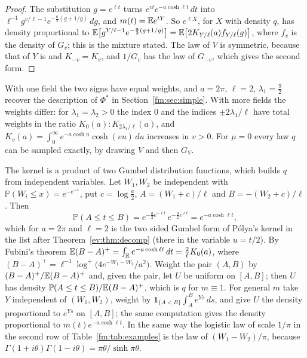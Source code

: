 \begin{proof}
The substitution $g=e^{\ell t}$ turns $e^{vt}e^{-a\cosh\ell t}\,dt$ into $\ell^{-1}g^{v/\ell-1}e^{-\frac a2(g+1/g)}\,dg$, and $m(t)=\mathbb{E} e^{tY}$. So $e^{\ell X}$, for $X$ with density $q$, has density proportional to $\mathbb{E}\big[g^{Y/\ell-1}e^{-\frac a2(g+1/g)}\big]=\mathbb{E}\big[2K_{Y/\ell}(a)f_{Y/\ell}(g)\big]$, where $f_v$ is the density of $G_v$; this is the mixture stated. The law of $V$ is symmetric, because that of $Y$ is and $K_{-v}=K_v$, and $1/G_v$ has the law of $G_{-v}$, which gives the second form.
\end{proof}

With one field the two signs have equal weights, and $a=2\pi$, $\ell=2$, $\lambda_1=\frac92$ recover the description of $\Phi^*$ in Section~\ref{fm:sec:simple}. With more fields the weights differ: for $\lambda_1=\lambda_2>0$ the index $0$ and the indices $\pm2\lambda_1/\ell$ have total weights in the ratio $K_0(a):K_{2\lambda_1/\ell}(a)$, and $K_v(a)=\int_0^\infty e^{-a\cosh u}\cosh(vu)\,du$ increases in $v>0$. For $\mu=0$ every law $q$ can be sampled exactly, by drawing $V$ and then $G_V$.

\begin{remark}\label{fm:rem:besselgumbel}
The kernel is a product of two Gumbel distribution functions, which builds $q$ from independent variables. Let $W_1,W_2$ be independent with $\mathbb P(W_i\le x)=e^{-e^{-x}}$, put $c=\log\frac a2$, $A=(W_1+c)/\ell$ and $B=-(W_2+c)/\ell$. Then
\[
\mathbb P(A\le t\le B)=e^{-\frac a2e^{-\ell t}}\,e^{-\frac a2e^{\ell t}}=e^{-a\cosh\ell t},
\]
which for $a=2\pi$ and $\ell=2$ is the two sided Gumbel form of P\'olya's kernel in the list after Theorem~\ref{ev:thm:decomp} (there in the variable $u=t/2$). By Fubini's theorem $\mathbb{E}(B-A)^+=\int_{\mathbb{R}}e^{-a\cosh\ell t}\,dt=\frac2\ell K_0(a)$, where $(B-A)^+=\ell^{-1}\log^+\big(4e^{-W_1-W_2}/a^2\big)$. Weight the pair $(A,B)$ by $(B-A)^+/\mathbb{E}(B-A)^+$ and, given the pair, let $U$ be uniform on $[A,B]$; then $U$ has density $\mathbb P(A\le t\le B)/\mathbb{E}(B-A)^+$, which is $q$ for $m\equiv1$. For general $m$ take $Y$ independent of $(W_1,W_2)$, weight by $\mathbf 1_{\{A<B\}}\int_A^Be^{Ys}\,ds$, and give $U$ the density proportional to $e^{Ys}$ on $[A,B]$; the same computation gives the density proportional to $m(t)e^{-a\cosh\ell t}$. In the same way the logistic law of scale $1/\pi$ in the second row of Table~\ref{fm:tab:examples} is the law of $(W_1-W_2)/\pi$, because $\Gamma(1+i\theta)\Gamma(1-i\theta)=\pi\theta/\sinh\pi\theta$.
\end{remark}

